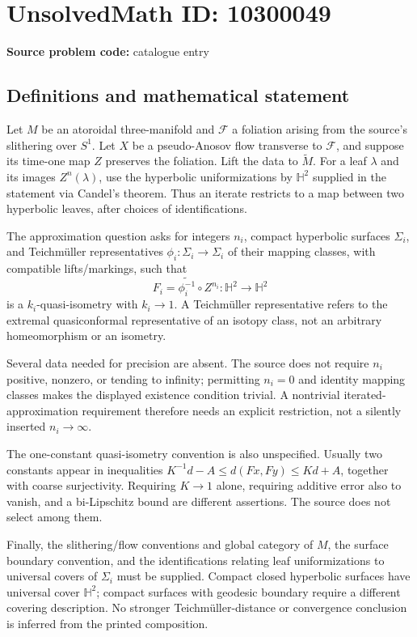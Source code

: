 \documentclass[11pt]{article}
\begin{document}
\section*{UnsolvedMath ID: 10300049}
\textbf{Source problem code:} catalogue entry
\subsection{Definitions and mathematical statement}
Let $M$ be an atoroidal three-manifold and $\mathscr F$ a foliation arising from the source's slithering over $S^1$. Let $X$ be a pseudo-Anosov flow transverse to $\mathscr F$, and suppose its time-one map $Z$ preserves the foliation. Lift the data to $\widetilde M$. For a leaf $\lambda$ and its images $Z^n(\lambda)$, use the hyperbolic uniformizations by $\mathbb H^2$ supplied in the statement via Candel's theorem. Thus an iterate restricts to a map between two hyperbolic leaves, after choices of identifications.

The approximation question asks for integers $n_i$, compact hyperbolic surfaces $\Sigma_i$, and Teichm\"uller representatives $\phi_i:\Sigma_i\to\Sigma_i$ of their mapping classes, with compatible lifts/markings, such that
\[
F_i=\widetilde{\phi_i^{-1}}\circ Z^{n_i}:\mathbb H^2\longrightarrow\mathbb H^2
\]
is a $k_i$-quasi-isometry with $k_i\to1$. A Teichm\"uller representative refers to the extremal quasiconformal representative of an isotopy class, not an arbitrary homeomorphism or an isometry.

Several data needed for precision are absent. The source does not require $n_i$ positive, nonzero, or tending to infinity; permitting $n_i=0$ and identity mapping classes makes the displayed existence condition trivial. A nontrivial iterated-approximation requirement therefore needs an explicit restriction, not a silently inserted $n_i\to\infty$.

The one-constant quasi-isometry convention is also unspecified. Usually two constants appear in inequalities $K^{-1}d-A\leq d(Fx,Fy)\leq Kd+A$, together with coarse surjectivity. Requiring $K\to1$ alone, requiring additive error also to vanish, and a bi-Lipschitz bound are different assertions. The source does not select among them.

Finally, the slithering/flow conventions and global category of $M$, the surface boundary convention, and the identifications relating leaf uniformizations to universal covers of $\Sigma_i$ must be supplied. Compact closed hyperbolic surfaces have universal cover $\mathbb H^2$; compact surfaces with geodesic boundary require a different covering description. No stronger Teichm\"uller-distance or convergence conclusion is inferred from the printed composition.
\end{document}
